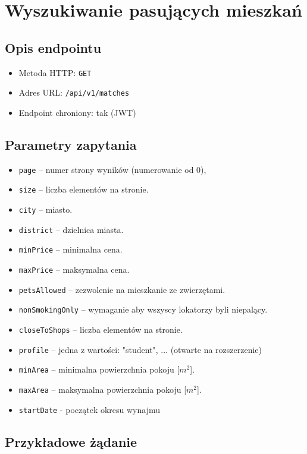 \documentclass[11pt, a4paper]{article}
\begin{document}
\section{Wyszukiwanie pasujących mieszkań}

\subsection{Opis endpointu}

\begin{itemize}
    \item Metoda HTTP: \texttt{GET}
    \item Adres URL: \texttt{/api/v1/matches}
    \item Endpoint chroniony: tak (JWT)
\end{itemize}

\subsection{Parametry zapytania}

\begin{itemize}
    \item \texttt{page} – numer strony wyników (numerowanie od 0),
    \item \texttt{size} – liczba elementów na stronie.
    \item \texttt{city} – miasto.
    \item \texttt{district} – dzielnica miasta.
    \item \texttt{minPrice} – minimalna cena.
    \item \texttt{maxPrice} – maksymalna cena.
    \item \texttt{petsAllowed} – zezwolenie na mieszkanie ze zwierzętami.
    \item \texttt{nonSmokingOnly} – wymaganie aby wszyscy lokatorzy byli niepalący.
    \item \texttt{closeToShops} – liczba elementów na stronie.
    \item \texttt{profile} – jedna z wartości: "student", ... (otwarte na rozszerzenie)
    \item \texttt{minArea} – minimalna powierzchnia pokoju [$m^2$].
    \item \texttt{maxArea} – maksymalna powierzchnia pokoju [$m^2$].
    \item \texttt{startDate} - początek okresu wynajmu
\end{itemize}

\subsection{Przykładowe żądanie}
\end{document}

